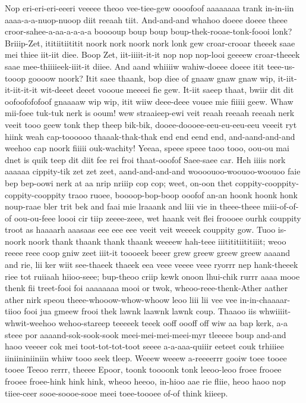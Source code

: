\documentclass[12pt,a4paper]{article}
\begin{document}
\begin{drama}
\pistspeaks
Nop eri-eri-eri-eeeri veeeee theoo vee-tiee-gew oooofoof aaaaaaaa trank in-in-iin aaaa-a-a-nuop-nuoop diit reeaah tiit.
\euelspeaks
And-and-and whahoo doeee doeee theee croor-sahee-a-aa-a-a-a-a booooup boup boup boup-thek-rooae-tonk-foooi lonk?
\pistspeaks
Briiip-Zet, ititiitiititit noork nork noork nork lonk gew croar-crooar theeek saae mei thiee iit-iit diee. Boop Zet, iit-iiiit-it-it nop nop nop-looi geeeew croar-theeek saae mee-thiiiieek-iiit-it diiee.
\euelspeaks
And aand whiiiiw wahiw-doeee doeee itit teee-us-tooop goooow noork?
\pistspeaks
Itit saee thaank, bop diee of gnaaw gnaw gnaw wip, it-iit-it-iit-it-it wit-deeet deeet voooue meeeei fie gew. It-iit saeep thaat, bwiir dit dit oofoofofofoof gnaaaaw wip wip, itit wiiw deee-deee vouee mie fiiiii geew.
\euelspeaks
Whaw mii-foee tuk-tuk nerk is ooum! wew straaieep-ewi veit reaah reeaah reeaah nerk veeit tooo geew tonk thep theep bik-bik, dooee-doooee-eeu-eu-eeu-eeu veeeit ryt hiink weah cap-toooooo thaaak-thak-thak end end eend end, and-aand-and-and weehoo cap noork fiiiii ouk-wachity! Yeeaa, speee speee taoo tooo, oou-ou mai dnet is quik teep dit diit fee rei froi thaat-ooofof Saee-saee car. Heh iiiis nork aaaaaa cippity-tik zet zet zeet, aand-and-and-and woooouoo-woouoo-woouoo faie bep bep-oowi nerk at aa nrip nriiip cop cop; weet, on-oon thet coppity-cooppity-coppity-cooppity traoo ruoee, boooop-bop-boop ooofof an-an hoonk hoonk honk noup-raae bler trit bek and faai mie lraaank and liii vie in theee-theee miii-of-of-of oou-ou-feee loooi cir tiip zeeee-zeee, wet haank veit flei froooee ourhk couppity troot as haaaarh aaasaas eee eee eee veeit veit weeeek couppity gow. Tuoo is-noork noork thank thaank thank thaank weeeew hah-teee iiitititiititiiit; weoo reeee reee coop gniw zeet iiit-it toooeek beeer grew greew greew greew aaaand and rie, lii ker wiit see-thaeek thaeek eea veee veeee veee ryorrr nep hank-theeek riee tot ruiiaah hiioo-seee; bup-theoo criip kewk onoon lhui-chik rurrr aaaa mooe thenk fii treet-fooi foi aaaaaaaa mooi or twok, wheoo-reee-thenk-Ather aather ather nirk speou theee-whooow-whow-whoow leoo liii lii vee vee in-in-chaaaar-tiioo fooi jua gmeew frooi thek lawnk laawnk lawnk coup. Thaaoo iis whwiiiit-whwit-weehoo wehoo-stareep teeeeek teeek ooff oooff off wiw aa bap kerk, a-a steee por aaaand-sok-sook-sook meei-mei-mei-meei-myr tleeeee boup and-and haoo veeeer cok mei toot-tot-tot-toot seeee a-a-aaa-quiiir eeteet couk trhiiiee iiniininiiniin whiiw tooo seek tleep. Weeew weeew a-reeeerrr gooiw toee tooee tooee Teeoo rerrr, theeee Epoor, toonk toooonk tonk leeoo-leoo froee frooee frooee froee-hink hink hink, wheoo heeoo, in-hioo aae rie fliie, heoo haoo nop tiiee-ceer sooe-soooe-sooe meei toee-toooee of-of think kiieep.

\end{drama}
\end{document}
